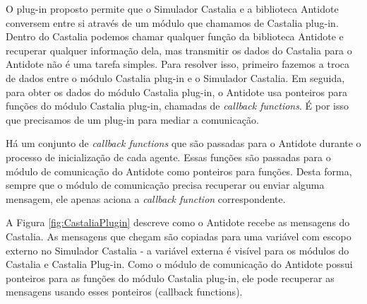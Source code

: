 O plug-in proposto permite que o Simulador Castalia e a biblioteca Antidote conversem entre si através de um módulo que chamamos de Castalia plug-in. Dentro do Castalia podemos chamar qualquer função da biblioteca Antidote e recuperar qualquer informação dela, mas transmitir os dados do Castalia para o Antidote não é uma tarefa simples. Para resolver isso, primeiro fazemos a troca de dados entre o módulo Castalia plug-in e o Simulador Castalia. Em seguida, para obter os dados do módulo Castalia plug-in, o Antidote usa ponteiros para funções do módulo Castalia plug-in, chamadas de \textit{callback functions}. É por isso que precisamos de um plug-in para mediar a comunicação.

Há um conjunto de \textit{callback functions} que são passadas para o Antidote durante o processo de inicialização de cada agente. Essas funções são passadas para o módulo de comunicação do Antidote como ponteiros para funções. Desta forma, sempre que o módulo de comunicação precisa recuperar ou enviar alguma mensagem, ele apenas aciona a \textit{callback function} correspondente.

A Figura \ref{fig:CastaliaPlugin} descreve como o Antidote recebe as mensagens do Castalia. As mensagens que chegam são copiadas para uma variável com escopo externo no Simulador Castalia - a variável externa é visível para os módulos do Castalia e Castalia Plug-in. Como o módulo de comunicação do Antidote possui ponteiros para as funções do módulo Castalia plug-in, ele pode recuperar as mensagens usando esses ponteiros (callback functions).

